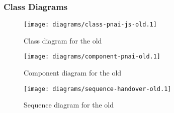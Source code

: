 \subsubsection{Class Diagrams} %
\label{ssub:classdiagramsold}

\begin{figure}[htbp]
  \centering
    \texttt{[image: diagrams/class-pnai-js-old.1]}
  \caption{Class diagram for the old }
  \label{fig:classdiagramsold}
\end{figure}

\begin{figure}[htbp]
  \centering
    \texttt{[image: diagrams/component-pnai-old.1]}
  \caption{Component diagram for the old }
  \label{fig:componentdiagramsold}
\end{figure}

\begin{figure}[htbp]
  \centering
    \texttt{[image: diagrams/sequence-handover-old.1]}
  \caption{Sequence diagram for the old }
  \label{fig:handoverscenarioold}
\end{figure}

